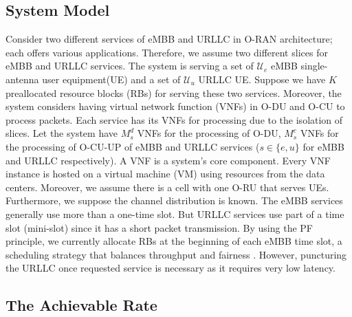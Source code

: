\documentclass[conference]{IEEEtran}
\begin{document}
\subsection{System Model}
Consider two different services of eMBB and URLLC in O-RAN architecture; each offers various applications.
Therefore, we assume two different slices for eMBB and URLLC services. The system is serving a set of $\mathcal{U}_e$ eMBB single-antenna user equipment(UE) and a set of $\mathcal{U}_u$ URLLC UE. Suppose we have $K$ preallocated resource blocks (RBs) for serving these two services.
 Moreover, the system considers having  virtual network function (VNFs) in O-DU and O-CU to process packets. Each service has its VNFs for processing due to the isolation of slices.
Let the system have $M_s^{d}$ VNFs for the processing of O-DU, $M_s^{c}$ VNFs for the processing of O-CU-UP of eMBB and URLLC services ($ s \in \{e, u\}$ for eMBB and URLLC respectively).
A VNF is a system's core component. Every VNF instance is hosted on a virtual machine (VM) using resources from the data centers. 
Moreover, we assume there is a cell with one O-RU that serves UEs.
Furthermore, we suppose the channel distribution is known.
The eMBB services generally use more than a one-time slot. But URLLC services use part of a time slot (mini-slot) since it has a short packet transmission. 
By using the PF principle, we currently allocate RBs at the beginning of each eMBB time slot, a scheduling strategy that balances throughput and fairness \cite{shi2022risk}. 
However, puncturing the URLLC once requested service is necessary as it requires very low latency.
\subsection{The Achievable Rate}
\end{document}
